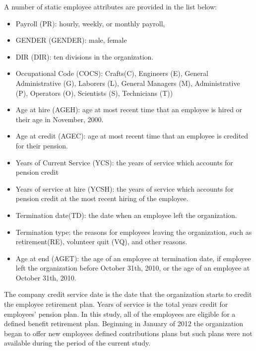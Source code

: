 \documentclass[12pt,letterpaper]{article}
\begin{document}
A number of static employee attributes are provided in the list below: 
\begin{itemize}
	\item Payroll (PR): hourly, weekly, or monthly payroll,
	\item GENDER (GENDER): male, female
	\item DIR (DIR): ten divisions in the organization.
	\item Occupational Code (COCS): Crafts(C), Engineers (E), General Administrative (G), Laborers (L), General Managers (M),  Administrative (P),  Operators (O), Scientists (S), Technicians (T))
	\item Age at hire (AGEH): age at most recent time that an employee is hired or their age in November, 2000.
	\item Age at credit (AGEC): age at most recent time that an employee is credited for their pension.
	\item Years of Current Service (YCS): the years of service which accounts for pension credit
	\item Years of service at hire (YCSH): the years of service which accounts for pension credit at the most recent hiring of the employee.
	\item Termination date(TD): the date when an employee left the organization.
	\item Termination type: the reasons for employees leaving the organization, such as retirement(RE),  volunteer quit (VQ), and other reasons.
	\item Age at end (AGET): the age of an employee at termination date, if employee left the organization before October 31th, 2010, or the age of an employee at October 31th, 2010.
\end{itemize}


The company credit service date is the date that the organization starts to credit the employee retirement plan. Years of service is the total years credit for employees' pension plan. In this study, all of the employees are eligible for a defined benefit retirement plan. Beginning in January of 2012 the organization began to offer new employees defined contributions plans but such plans were not available during the period of the current study.
\end{document}
